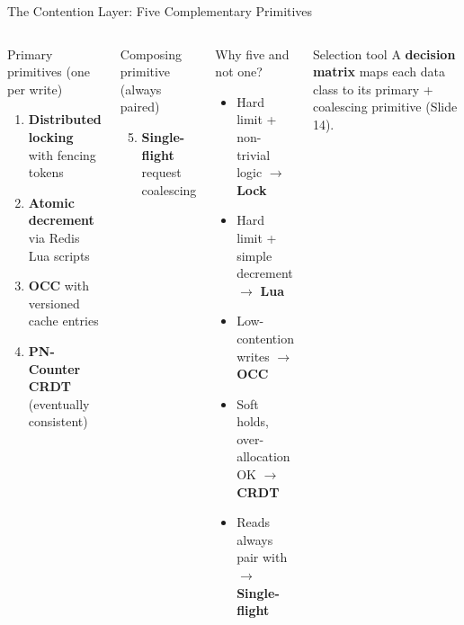 \documentclass[aspectratio=169,xcolor=dvipsnames,9pt]{beamer}
\begin{document}
\begin{frame}{The Contention Layer: Five Complementary Primitives}
\begin{columns}[T]
  \begin{block}{Primary primitives (one per write)}
    \footnotesize
    \begin{enumerate}
      \item \textbf{Distributed locking} with fencing tokens
      \item \textbf{Atomic decrement} via Redis Lua scripts
      \item \textbf{OCC} with versioned cache entries
      \item \textbf{PN-Counter CRDT} (eventually consistent)
    \end{enumerate}
  \end{block}
  \begin{block}{Composing primitive (always paired)}
    \footnotesize
    \begin{enumerate}\setcounter{enumi}{4}
      \item \textbf{Single-flight} request coalescing
    \end{enumerate}
  \end{block}

  \begin{exampleblock}{Why five and not one?}
    \footnotesize
    \begin{itemize}
      \item Hard limit + non-trivial logic $\to$ \textbf{Lock}
      \item Hard limit + simple decrement $\to$ \textbf{Lua}
      \item Low-contention writes $\to$ \textbf{OCC}
      \item Soft holds, over-allocation OK $\to$ \textbf{CRDT}
      \item Reads always pair with $\to$ \textbf{Single-flight}
    \end{itemize}
  \end{exampleblock}
  \begin{alertblock}{Selection tool}
    \footnotesize
    A \textbf{decision matrix} maps each data class to its primary + coalescing primitive (Slide 14).
  \end{alertblock}
\end{columns}
\end{frame}
\end{document}
